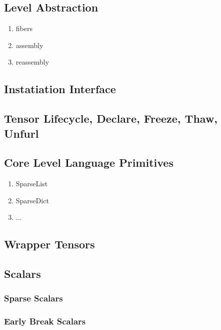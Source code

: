 
\subsection{Level Abstraction}
    
\begin{enumerate}
\item fibers
\item assembly
\item reassembly
\end{enumerate}

\subsection{Instatiation Interface}

\subsection{Tensor Lifecycle, Declare, Freeze, Thaw, Unfurl}


\subsection{Core Level Language Primitives}
\begin{enumerate}
\item SparseList
\item SparseDict
\item ...
\end{enumerate}



\subsection{Wrapper Tensors}

\subsection{Scalars}

\subsubsection{Sparse Scalars}
\subsubsection{Early Break Scalars}

